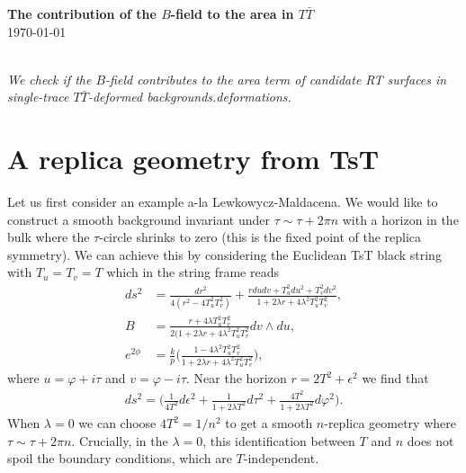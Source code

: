 \documentclass[11pt,a4paper]{article}
\def\l{\lambda}
\def\vp{\varphi}
\def\we{\wedge}
\newcommand{\eq}[1]{\begin{align}#1\end{align}}
\newcommand{\eqsp}[1]{\begin{equation}\begin{split}#1\end{split}\end{equation}}
\begin{document}
\begin{center}
{\Large \bf The contribution of the $B$-field to the area in $T\bar T$}\\
\today
\vspace{5pt}

\bigskip
\parbox{\textwidth} {\hrulefill\\
\emph{We check if the $B$-field contributes to the area term of candidate RT surfaces in single-trace $T\bar T$-deformed backgrounds.deformations.}\vspace{-5pt}

\hrulefill
}
\end{center}

\tableofcontents

\bigskip



\section{A replica geometry from TsT}



Let us first consider an example a-la Lewkowycz-Maldacena. We would like to construct a smooth background invariant under $\tau \sim \tau + 2\pi n$ with a horizon in the bulk where the $\tau$-circle shrinks to zero (this is the fixed point of the replica symmetry). We can achieve this by considering the Euclidean TsT black string with $T_u = T_v = T$ which in the string frame reads
\eqsp{
ds^2 &= \frac{dr^2}{4(r^2 - 4 T_u^2 T_v^2)} + \frac{r du dv + T_u^2 du^2 + T_v^2 dv^2}{1 + 2 \lambda r + 4 \lambda^2 T_u^2 T_v^2},\\
B &= \frac{r + 4 \lambda T_u^2 T_v^2}{2(1 + 2 \lambda r + 4 \lambda^2 T_u^2 T_v^2} dv \we du, \\
e^{2\phi} &= \frac{k}{p} \bigg(\frac{1- 4 \l^2 T_u^2 T_v^2}{1 + 2 \lambda r + 4 \lambda^2 T_u^2 T_v^2} \bigg), \label{tstbackground}
}
where $u = \vp + i \tau$ and $v = \vp - i \tau$. Near the horizon $r = 2T^2 + \epsilon^2$ we find that 
\eq{
ds^2 =  \bigg( \frac{1}{4T^2} d\epsilon^2 + \frac{1}{1 + 2 \lambda T^2} d\tau^2 + \frac{4T^2}{1+2\l T^2} d\vp^2 \bigg).
}
When $\l=0$ we can choose $4T^2 = 1/n^2$ to get a smooth $n$-replica geometry where $\tau \sim \tau + 2\pi n$. Crucially, in the $\l = 0$, this identification between $T$ and $n$ does not spoil the boundary conditions, which are $T$-independent. 
\end{document}
